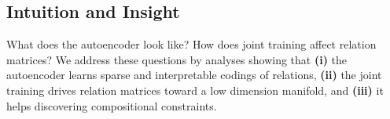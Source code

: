 \documentclass[11pt,a4paper]{article}
\newcommand{\mat}[1]{\bm{#1}}
\begin{document}





\subsection{Intuition and Insight}\label{sec:analyzeautoenc}

What does the autoencoder look like? How does joint training affect 
relation matrices? We address these questions by analyses 
showing that \textbf{(i)} the autoencoder learns sparse and interpretable 
codings of relations, \textbf{(ii)} the joint training drives relation matrices 
toward a low dimension manifold, and \textbf{(iii)} it helps discovering compositional 
constraints.
\end{document}
